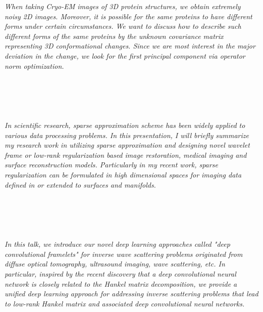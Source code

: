 \begin{multicols}{2}
\\ 
        \\
        \\\\
\\
      \textit{When taking Cryo-EM images of 3D protein structures, we obtain extremely noisy 2D images. Moreover, it is possible for the same proteins to have different forms under certain circumstances. We want to discuss how to describe such different forms of the same proteins by the unknown covariance matrix representing 3D conformational changes. Since we are most interest in the major deviation in the change, we look for the first principal component via operator norm optimization.}\\
\\ 
        \\
        \\\\
\\
      \textit{In scientific research, sparse approximation scheme has been widely applied to various data processing problems. In this presentation, I will briefly summarize my research work in utilizing sparse approximation and designing novel wavelet frame or low-rank regularization based image restoration, medical imaging and surface reconstruction models. Particularly in my recent work, sparse regularization can be formulated in high dimensional spaces for imaging data defined in or extended to surfaces and manifolds.}\\
\\ 
        \\
        \\\\
\\
      \textit{In this talk, we introduce our novel deep learning approaches called "deep convolutional framelets" for inverse wave scattering problems originated from diffuse optical tomography, ultrasound imaging, wave scattering, etc.  In particular,  inspired by the recent discovery that  a deep convolutional neural network is closely related to the Hankel matrix decomposition,  we provide a unified deep learning approach for addressing  inverse scattering problems that lead to low-rank Hankel matrix and associated deep convolutional neural networks.}\\
\\ 
        \\

\end{multicols}
